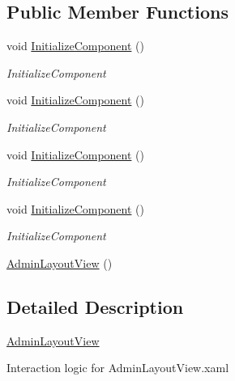 \subsection*{Public Member Functions}
\begin{DoxyCompactItemize}
\item 
void \mbox{\hyperlink{class_easy_library_application_1_1_w_p_f_1_1_view_1_1_admin_layout_view_a5c3a4a61e8a25227899483a51c38e5bc}{Initialize\+Component}} ()
\begin{DoxyCompactList}\small\item\em Initialize\+Component \end{DoxyCompactList}\item 
void \mbox{\hyperlink{class_easy_library_application_1_1_w_p_f_1_1_view_1_1_admin_layout_view_a5c3a4a61e8a25227899483a51c38e5bc}{Initialize\+Component}} ()
\begin{DoxyCompactList}\small\item\em Initialize\+Component \end{DoxyCompactList}\item 
void \mbox{\hyperlink{class_easy_library_application_1_1_w_p_f_1_1_view_1_1_admin_layout_view_a5c3a4a61e8a25227899483a51c38e5bc}{Initialize\+Component}} ()
\begin{DoxyCompactList}\small\item\em Initialize\+Component \end{DoxyCompactList}\item 
void \mbox{\hyperlink{class_easy_library_application_1_1_w_p_f_1_1_view_1_1_admin_layout_view_a5c3a4a61e8a25227899483a51c38e5bc}{Initialize\+Component}} ()
\begin{DoxyCompactList}\small\item\em Initialize\+Component \end{DoxyCompactList}\item 
\mbox{\hyperlink{class_easy_library_application_1_1_w_p_f_1_1_view_1_1_admin_layout_view_a7bb26fd9a574758411ff23d9cd5302f6}{Admin\+Layout\+View}} ()
\end{DoxyCompactItemize}


\subsection{Detailed Description}
\mbox{\hyperlink{class_easy_library_application_1_1_w_p_f_1_1_view_1_1_admin_layout_view}{Admin\+Layout\+View}} 

Interaction logic for Admin\+Layout\+View.\+xaml 

